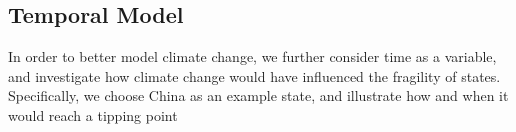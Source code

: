 
\subsection{Temporal Model}
In order to better model climate change, we further consider time as a variable, and investigate how climate change would have influenced the fragility of states. Specifically, we choose China as an example state, and illustrate how and when it would reach a tipping point 